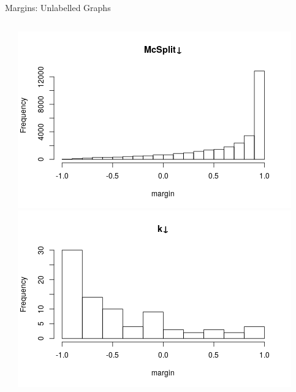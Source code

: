 \documentclass{beamer}
\begin{document}
\begin{frame}{Margins: Unlabelled Graphs}
\begin{columns}[t]
\begin{column}{0.5\textwidth}
    \end{column}
    \begin{column}{0.5\textwidth}
      \centering
      \includegraphics[width=\textwidth,height=0.4\textheight,keepaspectratio]{../dissertation/images/mcsplitdown_hist.png}
      \includegraphics[width=\textwidth,height=0.4\textheight,keepaspectratio]{../dissertation/images/kdown_hist.png}
    \end{column}
  \end{columns}
\end{frame}
\end{document}
